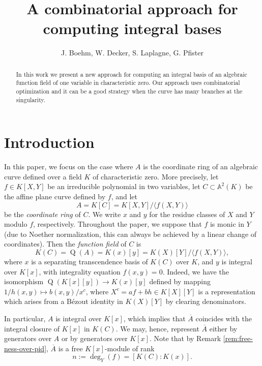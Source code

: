 \documentclass[a4paper,11pt]{amsart}%
\theoremstyle{definition}
\theoremstyle{plain}
\theoremstyle{remark}
\DeclareMathOperator{\TQR}{Q}
\begin{document}
\title[Combinatorial approach for integral bases]{A combinatorial approach for computing integral bases}
\author{J. Boehm, W. Decker, S. Laplagne, G. Pfister}

\begin{abstract}
In this work we present a new approach for computing an integral basis of an algebraic function field of one variable in characteristic zero. Our approach uses combinatorial optimization and it can be a good strategy when the curve has many branches at the singularity.
\end{abstract}
\maketitle

\section{Introduction}
\label{section:introduction}

In this paper, we focus on  the case where $A$ is the coordinate ring
of an algebraic curve defined over a field $K$ of characteristic zero.
More precisely, let $f\in K[X,Y]$ be an irreducible polynomial
in two variables, let $C\subset\mathbb{A}^{2}(K)$ be the affine plane curve
defined by $f$, and let
\[
A=K[C]=K[X,Y]/\langle f(X,Y)\rangle
\]
be the {\emph{coordinate ring}} of $C$. We write $x$ and $y$ for the residue
classes of $X$ and $Y$ modulo $f$, respectively. Throughout the paper, we
suppose that $f$ is monic in $Y$ (due to Noether normalization, this can
always be achieved by a linear change of coordinates). Then the
{\emph{function field}} of $C$ is
\[
K(C)=\TQR(A)=K(x)[y]=K(X)[Y]/\langle f(X,Y)\rangle,
\]
where $x$ is a separating transcendence basis of $K(C)$ over $K$, and $y$ is
integral over $K[x]$, with integrality equation $f(x,y)=0$.
Indeed, we have the isomorphism $\TQR(K[x][y]) \rightarrow  K(x)[y]$ defined by
mapping $1/h(x,y) \mapsto b(x,y) / x^c$, where $X^c = a f + b h\in K[X][Y]$
is a representation which arises from a B\'ezout identity in $K(X)[Y]$ by clearing denominators.

In particular, $A$
is integral over $K[x]$, which implies that $\overline{A}$ coincides with the
integral closure of $K[x]$ in $K(C)$. We may, hence,
represent $\overline{A}$ either by generators over $A$ or by generators over
$K[x]$. Note that by Remark \ref{rem:free-ness-over-pid}, $\overline{A}$
is a free $K[x]$-module of rank
\[
n:=\deg_{Y}(f)=[K(C):K(x)].
\]
\end{document}
